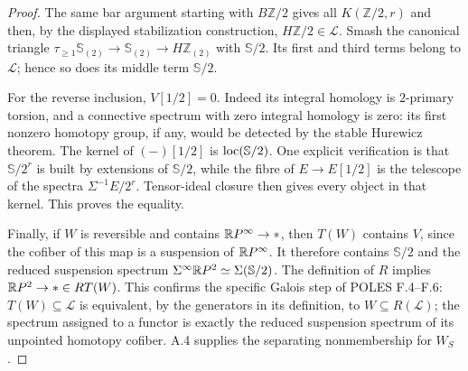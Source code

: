 \begin{proof}
The same bar argument starting with $B\mathbb Z/2$ gives all $K(\mathbb Z/2,r)$ and then, by the displayed stabilization construction, $H\mathbb Z/2\in\mathcal L$. Smash the canonical triangle
$\tau_{\geq1}\mathbb S_{(2)}\to\mathbb S_{(2)}\to H\mathbb Z_{(2)}$
with $\mathbb S/2$. Its first and third terms belong to $\mathcal L$; hence so does its middle term $\mathbb S/2$.

For the reverse inclusion, $V[1/2]=0$. Indeed its integral homology is $2$-primary torsion, and a connective spectrum with zero integral homology is zero: its first nonzero homotopy group, if any, would be detected by the stable Hurewicz theorem. The kernel of $(-)[1/2]$ is $\operatorname{loc}(\mathbb S/2)$. One explicit verification is that $\mathbb S/2^r$ is built by extensions of $\mathbb S/2$, while the fibre of $E\to E[1/2]$ is the telescope of the spectra $\Sigma^{-1}E/2^r$. Tensor-ideal closure then gives every object in that kernel. This proves the equality.

Finally, if $W$ is reversible and contains $\mathbb{R}P^\infty\to *$, then $T(W)$ contains $V$, since the cofiber of this map is a suspension of $\mathbb{R}P^\infty$. It therefore contains $\mathbb S/2$ and the reduced suspension spectrum $\Sigma^\infty\mathbb{R}P^2\simeq\Sigma(\mathbb S/2)$. The definition of $R$ implies $\mathbb{R}P^2\to *\in RT(W)$. This confirms the specific Galois step of POLES F.4--F.6: $T(W)\subseteq\mathcal L$ is equivalent, by the generators in its definition, to $W\subseteq R(\mathcal L)$; the spectrum assigned to a functor is exactly the reduced suspension spectrum of its unpointed homotopy cofiber. A.4 supplies the separating nonmembership for $W_S$.
\end{proof}

